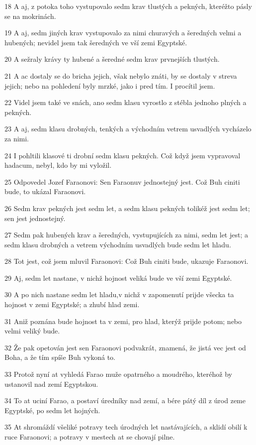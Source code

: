 \par 18 A aj, z potoka toho vystupovalo sedm krav tlustých a pekných, kteréžto pásly se na mokrinách.
\par 19 A aj, sedm jiných krav vystupovalo za nimi churavých a šeredných velmi a hubených; nevidel jsem tak šeredných ve vší zemi Egyptské.
\par 20 A sežraly krávy ty hubené a šeredné sedm krav prvnejších tlustých.
\par 21 A ac dostaly se do bricha jejich, však nebylo znáti, by se dostaly v streva jejich; nebo na pohledení byly mrzké, jako i pred tím. I procítil jsem.
\par 22 Videl jsem také ve snách, ano sedm klasu vyrostlo z stébla jednoho plných a pekných.
\par 23 A aj, sedm klasu drobných, tenkých a východním vetrem usvadlých vycházelo za nimi.
\par 24 I pohltili klasové ti drobní sedm klasu pekných. Což když jsem vypravoval hadacum, nebyl, kdo by mi vyložil.
\par 25 Odpovedel Jozef Faraonovi: Sen Faraonuv jednostejný jest. Což Buh ciniti bude, to ukázal Faraonovi.
\par 26 Sedm krav pekných jest sedm let, a sedm klasu pekných tolikéž jest sedm let; sen jest jednostejný.
\par 27 Sedm pak hubených krav a šeredných, vystupujících za nimi, sedm let jest; a sedm klasu drobných a vetrem východním usvadlých bude sedm let hladu.
\par 28 Tot jest, což jsem mluvil Faraonovi: Což Buh ciniti bude, ukazuje Faraonovi.
\par 29 Aj, sedm let nastane, v nichž hojnost veliká bude ve vší zemi Egyptské.
\par 30 A po nich nastane sedm let hladu,v nichž v zapomenutí prijde všecka ta hojnost v zemi Egyptské; a zhubí hlad zemi.
\par 31 Aniž poznána bude hojnost ta v zemi, pro hlad, kterýž prijde potom; nebo velmi veliký bude.
\par 32 Že pak opetován jest sen Faraonovi podvakrát, znamená, že jistá vec jest od Boha, a že tím spíše Buh vykoná to.
\par 33 Protož nyní at vyhledá Farao muže opatrného a moudrého, kteréhož by ustanovil nad zemí Egyptskou.
\par 34 To at uciní Farao, a postaví úredníky nad zemí, a bére pátý díl z úrod zeme Egyptské, po sedm let hojných.
\par 35 At shromáždí všeliké potravy tech úrodných let nastávajících, a sklidí obilí k ruce Faraonovi; a potravy v mestech at se chovají pilne.
